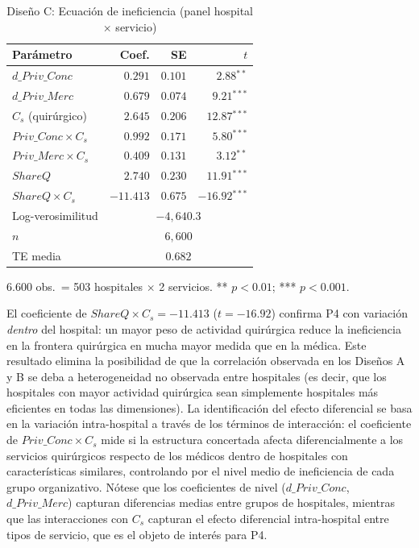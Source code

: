 \documentclass[12pt, a4paper, twoside, openright]{book}
\newcommand{\sig}[1]{\ensuremath{^{#1}}}
\theoremstyle{plain}
\theoremstyle{definition}
\theoremstyle{remark}
\begin{document}
\begin{table}[htbp]
\centering
\caption{Diseño C: Ecuación de ineficiencia (panel hospital $\times$ servicio)}
\label{tab:disC}
\begin{threeparttable}
\begin{tabular}{lrrr}
\toprule
\textbf{Parámetro} & \textbf{Coef.} & \textbf{SE} & \textbf{$t$} \\
\midrule
$d\_Priv\_Conc$ & $0.291$ & $0.101$ & $2.88$\sig{**} \\
$d\_Priv\_Merc$ & $0.679$ & $0.074$ & $9.21$\sig{***} \\
$C_s$ (quirúrgico) & $2.645$ & $0.206$ & $12.87$\sig{***} \\
$Priv\_Conc \times C_s$ & $0.992$ & $0.171$ & $5.80$\sig{***} \\
$Priv\_Merc \times C_s$ & $0.409$ & $0.131$ & $3.12$\sig{**} \\
$ShareQ$ & $2.740$ & $0.230$ & $11.91$\sig{***} \\
$ShareQ \times C_s$ & $-11.413$ & $0.675$ & $-16.92$\sig{***} \\
\midrule
Log-verosimilitud & \multicolumn{3}{c}{$-4{,}640.3$} \\
$n$ & \multicolumn{3}{c}{$6{,}600$} \\
TE media & \multicolumn{3}{c}{$0.682$} \\
\bottomrule
\end{tabular}
\begin{tablenotes}
  \small
  \item 6.600 obs.\ = 503 hospitales $\times$ 2 servicios. ** $p<0.01$; *** $p<0.001$.
\end{tablenotes}
\end{threeparttable}
\end{table}

El coeficiente de $ShareQ \times C_s = -11.413$ ($t=-16.92$) confirma P4 con variación \textit{dentro} del hospital: un mayor peso de actividad quirúrgica reduce la ineficiencia en la frontera quirúrgica en mucha mayor medida que en la médica. Este resultado elimina la posibilidad de que la correlación observada en los Diseños A y B se deba a heterogeneidad no observada entre hospitales (es decir, que los hospitales con mayor actividad quirúrgica sean simplemente hospitales más eficientes en todas las dimensiones). La identificación del efecto diferencial se basa en la variación intra-hospital a través de los términos de interacción: el coeficiente de $Priv\_Conc \times C_s$ mide si la estructura concertada afecta diferencialmente a los servicios quirúrgicos respecto de los médicos dentro de hospitales con características similares, controlando por el nivel medio de ineficiencia de cada grupo organizativo. Nótese que los coeficientes de nivel ($d\_Priv\_Conc$, $d\_Priv\_Merc$) capturan diferencias medias entre grupos de hospitales, mientras que las interacciones con $C_s$ capturan el efecto diferencial intra-hospital entre tipos de servicio, que es el objeto de interés para P4.
\end{document}
